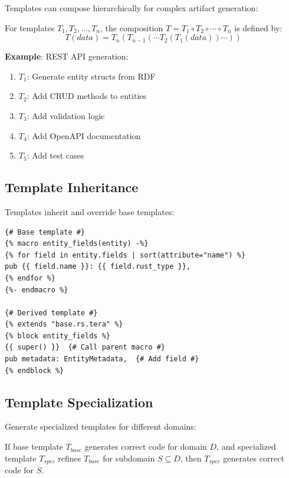 Templates can compose hierarchically for complex artifact generation:

\begin{definition}
    For templates $T_1, T_2, \ldots, T_n$, the composition $T = T_1 \circ T_2 \circ \cdots \circ T_n$ is defined by:
    \begin{equation}
        T(data) = T_n(T_{n-1}(\cdots T_2(T_1(data))\cdots))
    \end{equation}
\end{definition}

\textbf{Example}: REST API generation:
\begin{enumerate}
    \item $T_1$: Generate entity structs from RDF
    \item $T_2$: Add CRUD methods to entities
    \item $T_3$: Add validation logic
    \item $T_4$: Add OpenAPI documentation
    \item $T_5$: Add test cases
\end{enumerate}

\subsection{Template Inheritance}

Templates inherit and override base templates:

\begin{verbatim}
{# Base template #}
{% macro entity_fields(entity) -%}
{% for field in entity.fields | sort(attribute="name") %}
pub {{ field.name }}: {{ field.rust_type }},
{% endfor %}
{%- endmacro %}

{# Derived template #}
{% extends "base.rs.tera" %}
{% block entity_fields %}
{{ super() }}  {# Call parent macro #}
pub metadata: EntityMetadata,  {# Add field #}
{% endblock %}
\end{verbatim}

\subsection{Template Specialization}

Generate specialized templates for different domains:

\begin{theorem}
    If base template $T_{base}$ generates correct code for domain $D$, and specialized template $T_{spec}$ refines $T_{base}$ for subdomain $S \subseteq D$, then $T_{spec}$ generates correct code for $S$.
\end{theorem}

